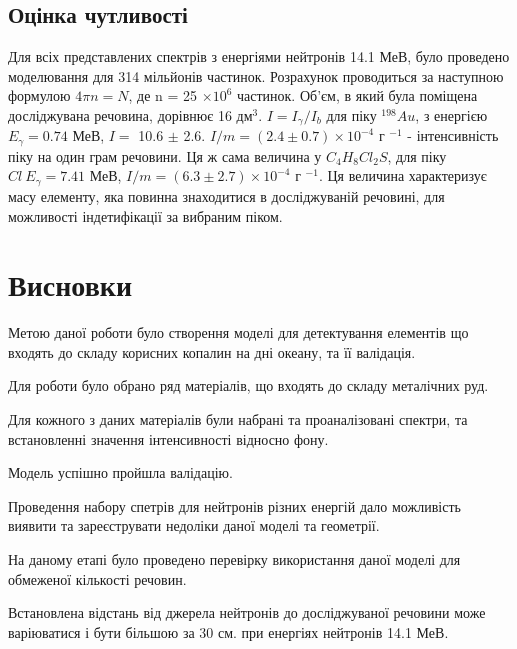 \documentclass[a4paper, 14pt]{article}
\numberwithin{equation}{section}
\numberwithin{table}{section}
\begin{document}
\subsection{Оцінка чутливості}
Для всіх представлених спектрів з енергіями нейтронів 14.1 МеВ, було проведено моделювання для 314 мільйонів частинок. Розрахунок проводиться за наступною формулою $ 4 \pi n = N$, де n = 25 $\times 10^6$ частинок. 
Об'єм, в який була поміщена досліджувана речовина, дорівнює 16 дм$^3$. $I = I_{\gamma} / I_{b}$ для піку $^{198}Au$, з енергією $E_\gamma = 0.74$ МеВ, $I = $ 10.6 $\pm$ 2.6. $I/m = (2.4 \pm 0.7) \times 10^{-4} $ г $^{-1}$ - інтенсивність піку на один грам речовини. Ця ж сама величина у $C_4H_8Cl_2S$, для піку $Cl \ E_\gamma = 7.41$ МеВ, $I/m = (6.3 \pm 2.7) \times 10^{-4} $ г $^{-1}$. Ця величина характеризує масу елементу, яка повинна знаходитися в досліджуваній речовині, для можливості індетифікації за вибраним піком.
  
\newpage 
\section{Висновки}
\setcounter{figure}{0}
Метою даної роботи було створення моделі для детектування елементів що входять до складу корисних копалин на дні океану, та її валідація.
	
Для роботи було обрано ряд матеріалів, що входять до складу металічних руд.

Для кожного з даних матеріалів були набрані та проаналізовані спектри, та встановленні значення інтенсивності відносно фону. 

Модель успішно пройшла валідацію.  

Проведення набору спетрів для нейтронів різних енергій дало можливість виявити та зареєструвати недоліки даної моделі та геометрії. 

На даному етапі було проведено перевірку використання даної моделі для обмеженої кількості речовин. 

Встановлена відстань від джерела нейтронів до досліджуваної речовини може варіюватися і бути більшою за 30 см. при енергіях нейтронів 14.1 МеВ.
	
\end{document}
